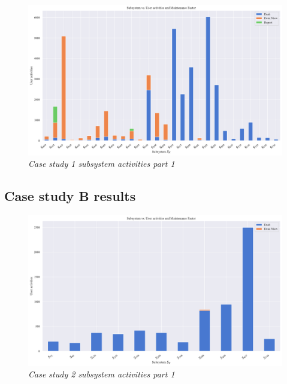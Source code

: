 \begin{figure}[!htb]
	\centering %
	\includegraphics[width=0.95\linewidth]{img/ch3/analysis/case_A_subsystems_1.pdf}
	\caption[Case study 1 subsystem activities part 1]
	{\textit{Case study 1 subsystem activities part 1}}\label{fig:ch3_caseAAnalysis}
\end{figure}



\clearpage

\subsection{Case study B results}

\begin{figure}[!htb]
	\centering %
	\includegraphics[width=0.95\linewidth]{img/ch3/analysis/case_B_subsystems_1.pdf}
	\caption[Case study 2 subsystem activities part 1]
	{\textit{Case study 2 subsystem activities part 1}}\label{fig:ch3_sbS1S246}
\end{figure} 

